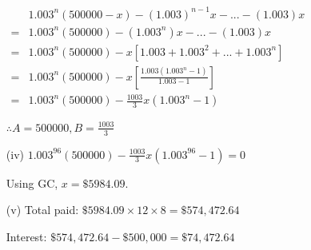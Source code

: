 \begin{enumerate}
$\begin{array}{cc}
 & 1.003^{n}\left(500000-x\right)-\left(1.003\right)^{n-1}x-...-\left(1.003\right)x\\
= & 1.003^{n}\left(500000\right)-\left(1.003^{n}\right)x-...-\left(1.003\right)x\\
= & 1.003^{n}\left(500000\right)-x\left[1.003+1.003^{2}+...+1.003^{n}\right]\\
= & 1.003^{n}\left(500000\right)-x\left[\frac{1.003\left(1.003^{n}-1\right)}{1.003-1}\right]\\
= & 1.003^{n}\left(500000\right)-\frac{1003}{3}x\left(1.003^{n}-1\right)
\end{array}$

$\therefore A=500000,B=\frac{1003}{3}$
\item[(iv)]  $1.003^{96}\left(500000\right)-\frac{1003}{3}x\left(1.003^{96}-1\right)=0$

Using GC, $x=\$5984.09$. 
\item[(v)]  Total paid: $\$5984.09\times12\times8=\$574,472.64$

Interest: $\$574,472.64-\$500,000=\$74,472.64$
\end{enumerate}